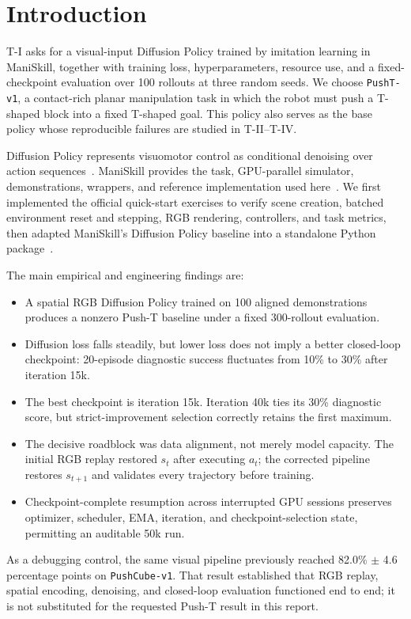 \section{Introduction}

T-I asks for a visual-input Diffusion Policy trained by imitation learning in ManiSkill, together
with training loss, hyperparameters, resource use, and a fixed-checkpoint evaluation over 100
rollouts at three random seeds. We choose \texttt{PushT-v1}, a contact-rich planar manipulation
task in which the robot must push a T-shaped block into a fixed T-shaped goal. This policy also
serves as the base policy whose reproducible failures are studied in T-II--T-IV.

Diffusion Policy represents visuomotor control as conditional denoising over action
sequences~\cite{chi2023diffusion}. ManiSkill provides the task, GPU-parallel simulator,
demonstrations, wrappers, and reference implementation used here~\cite{tao2024maniskill3,
maniskill_baseline}. We first implemented the official quick-start exercises to verify scene
creation, batched environment reset and stepping, RGB rendering, controllers, and task metrics,
then adapted ManiSkill's Diffusion Policy baseline into a standalone Python
package~\cite{maniskill_quickstart}.

The main empirical and engineering findings are:
\begin{itemize}
    \item A spatial RGB Diffusion Policy trained on 100 aligned demonstrations produces a
    nonzero Push-T baseline under a fixed 300-rollout evaluation.
    \item Diffusion loss falls steadily, but lower loss does not imply a better closed-loop
    checkpoint: 20-episode diagnostic success fluctuates from 10\% to 30\% after iteration 15k.
    \item The best checkpoint is iteration 15k. Iteration 40k ties its 30\% diagnostic score, but
    strict-improvement selection correctly retains the first maximum.
    \item The decisive roadblock was data alignment, not merely model capacity. The initial RGB
    replay restored $s_t$ after executing $a_t$; the corrected pipeline restores $s_{t+1}$ and
    validates every trajectory before training.
    \item Checkpoint-complete resumption across interrupted GPU sessions preserves optimizer,
    scheduler, EMA, iteration, and checkpoint-selection state, permitting an auditable 50k run.
\end{itemize}

As a debugging control, the same visual pipeline previously reached 82.0\% $\pm$ 4.6 percentage
points on \texttt{PushCube-v1}. That result established that RGB replay, spatial encoding,
denoising, and closed-loop evaluation functioned end to end; it is not substituted for the
requested Push-T result in this report.
